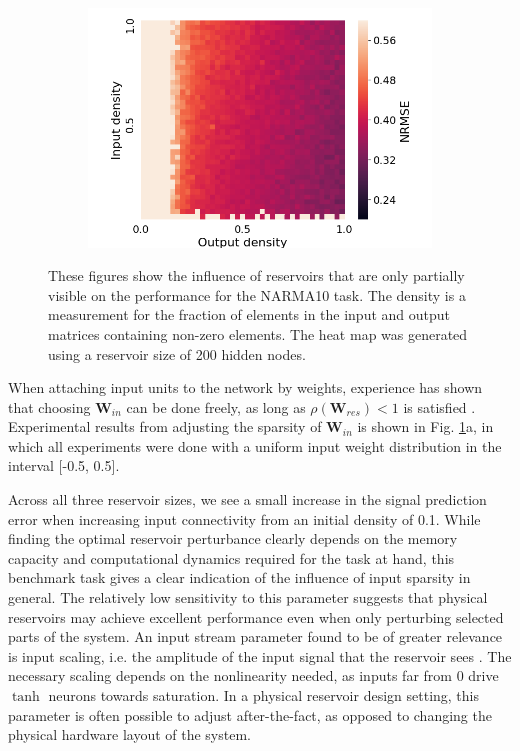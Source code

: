 \begin{figure}[htbp]
\begin{subfigure}{.3\textwidth}
    \caption{}
  \end{subfigure}
  \begin{subfigure}{.3\textwidth}
    \centering
    \includegraphics[width=\linewidth]{img/partial_visibility.png}
    \caption{}
  \end{subfigure}
  \caption{
    These figures show the influence of reservoirs that are only partially
visible on the performance for the NARMA10 task. The density is a measurement
for the fraction of elements in the input and output matrices containing
non-zero elements. The heat map was generated using a reservoir size of 200
hidden nodes.
  }
  \label{partial_visibility}
\end{figure}

When attaching input units to the network by weights, experience has shown that
choosing $\mathbf{W}_{in}$ can be done freely, as long as
$\rho(\mathbf{W}_{res}) < 1$ is satisfied \cite{jaeger_echo_2001}. Experimental
results from adjusting the sparsity of $\mathbf{W}_{in}$ is shown in
Fig. \ref{partial_visibility}a, in which all experiments were done with a
uniform input weight distribution in the interval [-0.5, 0.5].

Across all three reservoir sizes, we see a small increase in the signal
prediction error when increasing input connectivity from an initial density of
0.1. While finding the optimal reservoir perturbance clearly depends on the
memory capacity and computational dynamics required for the task at hand, this
benchmark task gives a clear indication of the influence of input sparsity in
general. The relatively low sensitivity to this parameter suggests that physical
reservoirs may achieve excellent performance even when only perturbing selected
parts of the system. An input stream parameter found to be of greater relevance
is input scaling, i.e. the amplitude of the input signal that the reservoir sees
\cite{alippi_quantification_2009}. The necessary scaling depends on the
nonlinearity needed, as inputs far from 0 drive $\tanh$ neurons towards
saturation. In a physical reservoir design setting, this parameter is often
possible to adjust after-the-fact, as opposed to changing the physical hardware
layout of the system.


